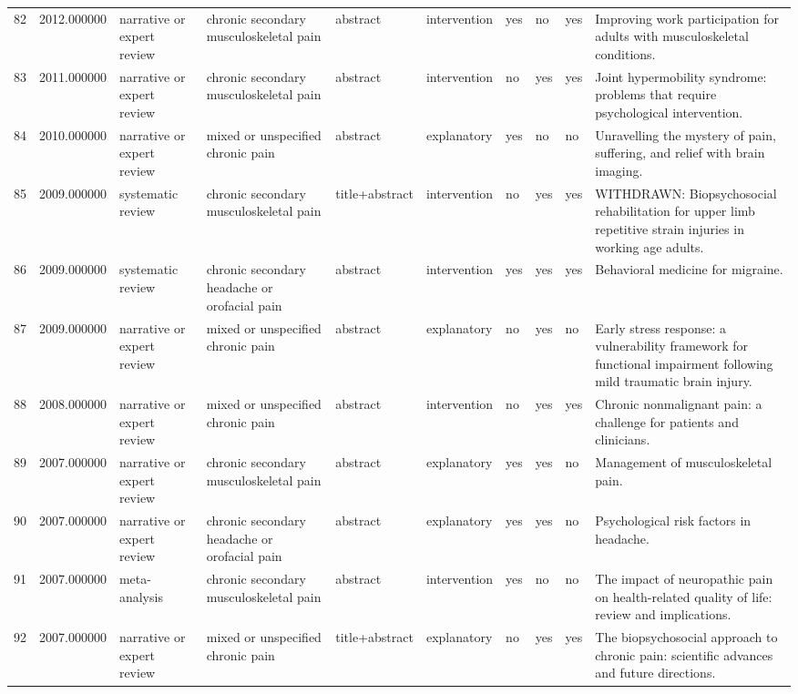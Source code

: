 \begin{longtable}{p{0.7cm}p{0.7cm}p{1.2cm}p{1.9cm}p{1.3cm}p{1.5cm}p{0.55cm}p{0.55cm}p{0.55cm}p{3.2cm}}
82 & 2012.000000 & narrative or expert review & chronic secondary musculoskeletal pain & abstract & intervention & yes & no & yes & Improving work participation for adults with musculoskeletal conditions. \\
83 & 2011.000000 & narrative or expert review & chronic secondary musculoskeletal pain & abstract & intervention & no & yes & yes & Joint hypermobility syndrome: problems that require psychological intervention. \\
84 & 2010.000000 & narrative or expert review & mixed or unspecified chronic pain & abstract & explanatory & yes & no & no & Unravelling the mystery of pain, suffering, and relief with brain imaging. \\
85 & 2009.000000 & systematic review & chronic secondary musculoskeletal pain & title+abstract & intervention & no & yes & yes & WITHDRAWN: Biopsychosocial rehabilitation for upper limb repetitive strain injuries in working age adults. \\
86 & 2009.000000 & systematic review & chronic secondary headache or orofacial pain & abstract & intervention & yes & yes & yes & Behavioral medicine for migraine. \\
87 & 2009.000000 & narrative or expert review & mixed or unspecified chronic pain & abstract & explanatory & no & yes & no & Early stress response: a vulnerability framework for functional impairment following mild traumatic brain injury. \\
88 & 2008.000000 & narrative or expert review & mixed or unspecified chronic pain & abstract & intervention & no & yes & yes & Chronic nonmalignant pain: a challenge for patients and clinicians. \\
89 & 2007.000000 & narrative or expert review & chronic secondary musculoskeletal pain & abstract & explanatory & yes & yes & no & Management of musculoskeletal pain. \\
90 & 2007.000000 & narrative or expert review & chronic secondary headache or orofacial pain & abstract & explanatory & yes & yes & no & Psychological risk factors in headache. \\
91 & 2007.000000 & meta-analysis & chronic secondary musculoskeletal pain & abstract & intervention & yes & no & no & The impact of neuropathic pain on health-related quality of life: review and implications. \\
92 & 2007.000000 & narrative or expert review & mixed or unspecified chronic pain & title+abstract & explanatory & no & yes & yes & The biopsychosocial approach to chronic pain: scientific advances and future directions. \\

\end{longtable}
